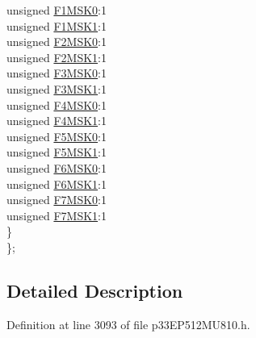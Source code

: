 \begin{DoxyCompactItemize}
\begin{tabbing}
\>\>unsigned \hyperlink{structtag_c1_f_m_s_k_s_e_l1_b_i_t_s_a9952c847f79c84f50eb02eb25c142de1}{F1MSK0}:1\\
\>\>unsigned \hyperlink{structtag_c1_f_m_s_k_s_e_l1_b_i_t_s_a919e35cf03d0a1f2f5051592ffa9cbfd}{F1MSK1}:1\\
\>\>unsigned \hyperlink{structtag_c1_f_m_s_k_s_e_l1_b_i_t_s_ac6a4a18ae01fc381bafcb1191120e5fe}{F2MSK0}:1\\
\>\>unsigned \hyperlink{structtag_c1_f_m_s_k_s_e_l1_b_i_t_s_a059bf9904fd1de3fba0cd36b4e707844}{F2MSK1}:1\\
\>\>unsigned \hyperlink{structtag_c1_f_m_s_k_s_e_l1_b_i_t_s_a933f211511778f34f7197d6f1446cfbf}{F3MSK0}:1\\
\>\>unsigned \hyperlink{structtag_c1_f_m_s_k_s_e_l1_b_i_t_s_acbfd612dda2ea9093d48421a1a6aeb85}{F3MSK1}:1\\
\>\>unsigned \hyperlink{structtag_c1_f_m_s_k_s_e_l1_b_i_t_s_a0b57e26cbb8ac3d7f23e2ff52ad93448}{F4MSK0}:1\\
\>\>unsigned \hyperlink{structtag_c1_f_m_s_k_s_e_l1_b_i_t_s_a056b9705d3f187f6a3b8d56a7f025d47}{F4MSK1}:1\\
\>\>unsigned \hyperlink{structtag_c1_f_m_s_k_s_e_l1_b_i_t_s_aabf68eb84d0abaaea6eb58ea0c6717a2}{F5MSK0}:1\\
\>\>unsigned \hyperlink{structtag_c1_f_m_s_k_s_e_l1_b_i_t_s_a4de591dd5403c030c6e9401d402ab2e0}{F5MSK1}:1\\
\>\>unsigned \hyperlink{structtag_c1_f_m_s_k_s_e_l1_b_i_t_s_ae8e2fb6480a891f846d5cec6322ca288}{F6MSK0}:1\\
\>\>unsigned \hyperlink{structtag_c1_f_m_s_k_s_e_l1_b_i_t_s_a6bf45a4628328ef6d1065f48315fadc9}{F6MSK1}:1\\
\>\>unsigned \hyperlink{structtag_c1_f_m_s_k_s_e_l1_b_i_t_s_a9b8e5abf9e41a053dd88f7d66b58954c}{F7MSK0}:1\\
\>\>unsigned \hyperlink{structtag_c1_f_m_s_k_s_e_l1_b_i_t_s_a09603fe5f0ffe52b1ab15fea39319ab2}{F7MSK1}:1\\
\>\} \\
\}; \\

\end{tabbing}\end{DoxyCompactItemize}


\subsection{Detailed Description}


Definition at line 3093 of file p33\+E\+P512\+M\+U810.\+h.



